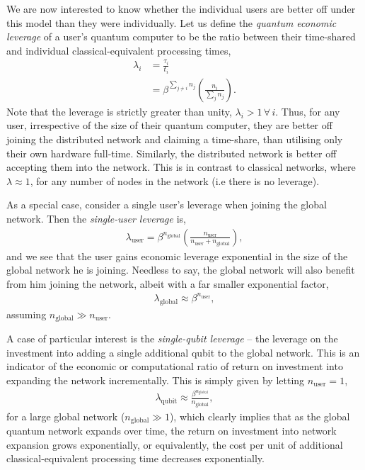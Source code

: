 \documentclass[aps,rmp,twocolumn,amsmath,amssymb,nofootinbib,superscriptaddress,longbibliography,floatfix,table-of-contents,eqsecnum]{revtex4-1}
\begin{document}
We are now interested to know whether the individual users are better off under this model than they were individually. Let us define the \textit{quantum economic leverage} of a user's quantum computer to be the ratio between their time-shared and individual classical-equivalent processing times,
\begin{align}
\lambda_i &= \frac{\tau_i}{t_i} \nonumber \\
&= \beta^{\sum_{j\neq i} n_j} \left(\frac{n_i}{\sum_j n_j}\right).
\end{align}
Note that the leverage is strictly greater than unity, \mbox{$\lambda_i>1\,\forall\, i$}. Thus, for any user, irrespective of the size of their quantum computer, they are better off joining the distributed network and claiming a time-share, than utilising only their own hardware full-time. Similarly, the distributed network is better off accepting them into the network. This is in contrast to classical networks, where \mbox{$\lambda\approx 1$}, for any number of nodes in the network (i.e there is no leverage).

As a special case, consider a single user's leverage when joining the global network. Then the \textit{single-user leverage} is,
\begin{align}
\lambda_\text{user} = \beta^{n_\text{global}} \left(\frac{n_\text{user}}{n_\text{user}+n_\text{global}}\right),
\end{align}
and we see that the user gains economic leverage exponential in the size of the global network he is joining. Needless to say, the global network will also benefit from him joining the network, albeit with a far smaller exponential factor,
\begin{align}
\lambda_\text{global} \approx \beta^{n_\text{user}},	
\end{align}
assuming \mbox{$n_\text{global}\gg n_\text{user}$}.

A case of particular interest is the \textit{single-qubit leverage} -- the leverage on the investment into adding a single additional qubit to the global network. This is an indicator of the economic or computational ratio of return on investment into expanding the network incrementally. This is simply given by letting \mbox{$n_\text{user}=1$},
\begin{align}
\lambda_\text{qubit} \approx \frac{\beta^{n_\text{global}}}{n_\mathrm{global}},
\end{align}
for a large global network (\mbox{$n_\mathrm{global}\gg 1$}), which clearly implies that as the global quantum network expands over time, the return on investment into network expansion grows exponentially, or equivalently, the cost per unit of additional classical-equivalent processing time decreases exponentially.
\end{document}
